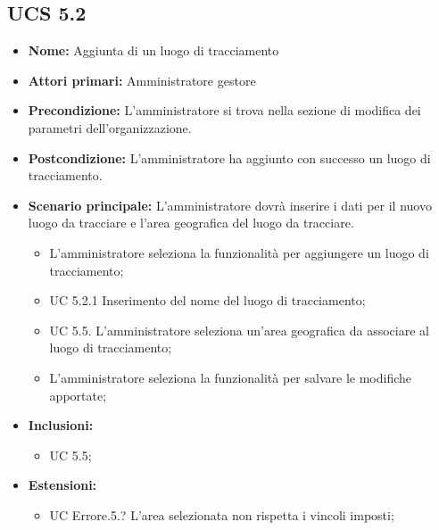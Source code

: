 \subsection{UCS 5.2}%
\begin{itemize}
    \item \textbf{Nome:} Aggiunta di un luogo di tracciamento
    \item \textbf{Attori primari:} Amministratore gestore
    \item \textbf{Precondizione:} L'amministratore si trova nella sezione di modifica dei parametri dell'organizzazione.
    \item \textbf{Postcondizione:} L'amministratore ha aggiunto con successo un luogo di tracciamento.
    \item \textbf{Scenario principale:} L'amministratore dovrà inserire i dati per il nuovo luogo da tracciare e l'area geografica del luogo da tracciare.
    \begin{itemize}%
        \item L'amministratore seleziona la funzionalità per aggiungere un luogo di tracciamento;
        \item UC 5.2.1 Inserimento del nome del luogo di tracciamento;
        \item UC 5.5. L'amministratore seleziona un'area geografica da associare al luogo di tracciamento;
        \item L'amministratore seleziona la funzionalità per salvare le modifiche apportate;
    \end{itemize} 
    \item \textbf{Inclusioni:}
    \begin{itemize}
        \item UC 5.5;
    \end{itemize}
    \item \textbf{Estensioni:}
    \begin{itemize}
        \item UC Errore.5.? L'area selezionata non rispetta i vincoli imposti;
    \end{itemize}
\end{itemize}

